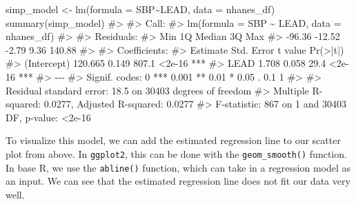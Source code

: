 \documentclass[
  letterpaper,
]{krantz}
\makeatletter
\newenvironment{Shaded}{\begin{snugshade}}{\end{snugshade}}
\newcommand{\AttributeTok}[1]{\textcolor[rgb]{0.40,0.45,0.13}{#1}}
\newcommand{\CommentTok}[1]{\textcolor[rgb]{0.37,0.37,0.37}{#1}}
\newcommand{\DecValTok}[1]{\textcolor[rgb]{0.68,0.00,0.00}{#1}}
\newcommand{\FunctionTok}[1]{\textcolor[rgb]{0.28,0.35,0.67}{#1}}
\newcommand{\NormalTok}[1]{\textcolor[rgb]{0.00,0.23,0.31}{#1}}
\newcommand{\OtherTok}[1]{\textcolor[rgb]{0.00,0.23,0.31}{#1}}
\newcommand{\SpecialCharTok}[1]{\textcolor[rgb]{0.37,0.37,0.37}{#1}}
\newcommand{\StringTok}[1]{\textcolor[rgb]{0.13,0.47,0.30}{#1}}
\newenvironment{kframe}{%
\medskip{}
\setlength{\fboxsep}{.8em}
 \def\at@end@of@kframe{}%
 \ifinner\ifhmode%
  \def\at@end@of@kframe{\end{minipage}}%
  \begin{minipage}{\columnwidth}%
 \fi\fi%
 \def\FrameCommand##1{\hskip\@totalleftmargin \hskip-\fboxsep
 \colorbox{shadecolor}{##1}\hskip-\fboxsep
     \hskip-\linewidth \hskip-\@totalleftmargin \hskip\columnwidth}%
 \MakeFramed {\advance\hsize-\width
   \@totalleftmargin\z@ \linewidth\hsize
   \@setminipage}}%
 {\par\unskip\endMakeFramed%
 \at@end@of@kframe}
\renewenvironment{Shaded}{\begin{kframe}}{\end{kframe}}
\makeatother
\begin{document}
\begin{Shaded}
\begin{Highlighting}[]
\NormalTok{simp\_model }\OtherTok{\textless{}{-}} \FunctionTok{lm}\NormalTok{(}\AttributeTok{formula =}\NormalTok{ SBP}\SpecialCharTok{\textasciitilde{}}\NormalTok{LEAD, }\AttributeTok{data =}\NormalTok{ nhanes\_df)}
\FunctionTok{summary}\NormalTok{(simp\_model)}
\CommentTok{\#\textgreater{} }
\CommentTok{\#\textgreater{} Call:}
\CommentTok{\#\textgreater{} lm(formula = SBP \textasciitilde{} LEAD, data = nhanes\_df)}
\CommentTok{\#\textgreater{} }
\CommentTok{\#\textgreater{} Residuals:}
\CommentTok{\#\textgreater{}    Min     1Q Median     3Q    Max }
\CommentTok{\#\textgreater{} {-}96.36 {-}12.52  {-}2.79   9.36 140.88 }
\CommentTok{\#\textgreater{} }
\CommentTok{\#\textgreater{} Coefficients:}
\CommentTok{\#\textgreater{}             Estimate Std. Error t value Pr(\textgreater{}|t|)    }
\CommentTok{\#\textgreater{} (Intercept)  120.665      0.149   807.1   \textless{}2e{-}16 ***}
\CommentTok{\#\textgreater{} LEAD           1.708      0.058    29.4   \textless{}2e{-}16 ***}
\CommentTok{\#\textgreater{} {-}{-}{-}}
\CommentTok{\#\textgreater{} Signif. codes:  0 \textquotesingle{}***\textquotesingle{} 0.001 \textquotesingle{}**\textquotesingle{} 0.01 \textquotesingle{}*\textquotesingle{} 0.05 \textquotesingle{}.\textquotesingle{} 0.1 \textquotesingle{} \textquotesingle{} 1}
\CommentTok{\#\textgreater{} }
\CommentTok{\#\textgreater{} Residual standard error: 18.5 on 30403 degrees of freedom}
\CommentTok{\#\textgreater{} Multiple R{-}squared:  0.0277, Adjusted R{-}squared:  0.0277 }
\CommentTok{\#\textgreater{} F{-}statistic:  867 on 1 and 30403 DF,  p{-}value: \textless{}2e{-}16}
\end{Highlighting}
\end{Shaded}

To visualize this model, we can add the estimated regression line to our
scatter plot from above. In \texttt{ggplot2}, this can be done with the
\texttt{geom\_smooth()} function. In base R, we use the
\texttt{abline()} function, which can take in a regression model as an
input. We can see that the estimated regression line does not fit our
data very well.

\begin{Shaded}
\end{Shaded}
\end{document}
